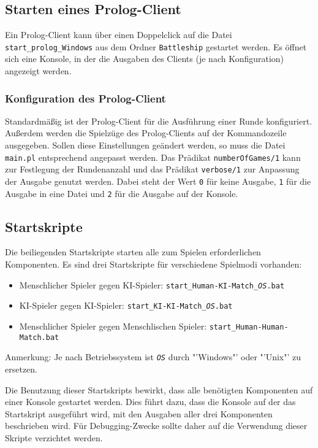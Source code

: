 \subsection{Starten eines Prolog-Client}
	Ein Prolog-Client kann über einen Doppelclick auf die Datei \texttt{start\_prolog\_Windows} aus dem Ordner 
	\texttt{Battleship} 
	gestartet werden. Es öffnet sich eine Konsole, in der die Ausgaben des Clients (je nach Konfiguration) angezeigt werden.
	
	\subsubsection {Konfiguration des Prolog-Client}
		Standardmäßig ist der Prolog-Client für die Ausführung einer Runde konfiguriert. Außerdem werden die Spielzüge des Prolog-Clients auf
		der Kommandozeile ausgegeben. Sollen diese Einstellungen geändert werden, so muss die Datei \texttt{main.pl} entsprechend angepasst werden.
		Das Prädikat \texttt{numberOfGames/1} kann zur Festlegung der Rundenanzahl und das Prädikat \texttt{verbose/1} zur Anpassung der Ausgabe 
		genutzt werden. Dabei steht der Wert \texttt{0} für keine Ausgabe, \texttt{1} für die Ausgabe in eine Datei und \texttt{2} für 
		die Ausgabe auf der Konsole.
\subsection{Startskripte} %
\label{sub:startskripte}
	Die beiliegenden Startskripte starten alle zum Spielen erforderlichen Komponenten. Es sind drei Startskripte für verschiedene Spielmodi vorhanden:
	\begin{itemize}
		\item Menschlicher Spieler gegen KI-Spieler: \texttt{start\_Human-KI-Match\_\emph{OS}.bat}
		\item KI-Spieler gegen KI-Spieler: \texttt{start\_KI-KI-Match\_\emph{OS}.bat}
		\item Menschlicher Spieler gegen Menschlischen Spieler: \texttt{start\_Human-Human-Match.bat}
	\end{itemize}
	Anmerkung: Je nach Betriebssystem ist \texttt{\emph{OS}} durch "'Windows"' oder "'Unix"' zu ersetzen.
	
	Die Benutzung dieser Startskripts bewirkt, dass alle benötigten Komponenten auf einer Konsole gestartet werden. Dies führt dazu, dass die Konsole 
	auf der das Startskript ausgeführt wird, mit den Ausgaben aller drei Komponenten beschrieben wird. Für Debugging-Zwecke sollte daher auf die Verwendung dieser 
	Skripte verzichtet werden.
